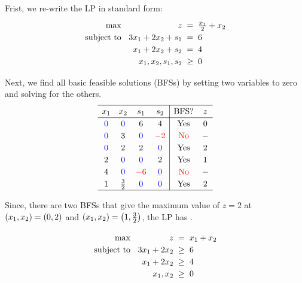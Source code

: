 \documentclass[a4paper, 10pt]{article}
\begin{document}
\begin{solution}
Frist, we re-write the LP in standard form:
\[
\begin{array}{@{\hspace{2mm}} r @{\hspace{2mm}} r @{\hspace{2mm}} c @{\hspace{2mm}} l}
    \text{max } & z & = & \frac{x_1}{2} + x_2 \\
    \text{subject to } & 3x_1 + 2x_2 + s_1 & = & 6 \\
    & x_1 + 2x_2 + s_2 & = & 4 \\
    & x_1, x_2, s_1, s_2 & \geq & 0
\end{array}
\]

Next, we find all basic feasible solutions (BFSs) by setting two variables to zero and solving for the others.
\[
\renewcommand{\arraystretch}{1.2}
\begin{array}{cccc|cc}
    \hline
    x_1 & x_2 & s_1 & s_2 & \text{BFS}? & z \\
    \hline
    \textcolor[HTML]{0000FF}{0} & \textcolor[HTML]{0000FF}{0} & 6 & 4 & \text{Yes} & 0 \\
    \textcolor[HTML]{0000FF}{0} & 3 & \textcolor[HTML]{0000FF}{0} & \textcolor[HTML]{FF0000}{-2} & \textcolor[HTML]{FF0000}{\text{No}} & - \\
    \textcolor[HTML]{0000FF}{0} & 2 & 2 & \textcolor[HTML]{0000FF}{0} & \text{Yes} & 2 \\
    2 & \textcolor[HTML]{0000FF}{0} & \textcolor[HTML]{0000FF}{0} & 2 & \text{Yes} & 1 \\
    4 & \textcolor[HTML]{0000FF}{0} & \textcolor[HTML]{FF0000}{-6} & \textcolor[HTML]{0000FF}{0} & \textcolor[HTML]{FF0000}{\text{No}} & - \\
    1 & \frac{3}{2} & \textcolor[HTML]{0000FF}{0} & \textcolor[HTML]{0000FF}{0} & \text{Yes} & 2 \\
    \hline
\end{array}
\]

Since, there are two BFSs that give the maximum value of \( z = 2 \) at \( (x_1, x_2) = \left( 0, 2 \right) \) and \( (x_1, x_2) = \left( 1, \frac{3}{2} \right) \), the LP has .
\end{solution}


\begin{subproblems_alpha}[start=3]
    \item
    \[
    \begin{array}{@{\hspace{2mm}} r @{\hspace{2mm}} r @{\hspace{2mm}} c @{\hspace{2mm}} l}
        \text{max } & z & = & x_1 + x_2 \\
        \text{subject to } & 3x_1 + 2x_2 & \geq & 6 \\
        & x_1 + 2x_2 & \geq & 4 \\
        & x_1, x_2 & \geq & 0
    \end{array}
    \]
\end{subproblems_alpha}
\end{document}
